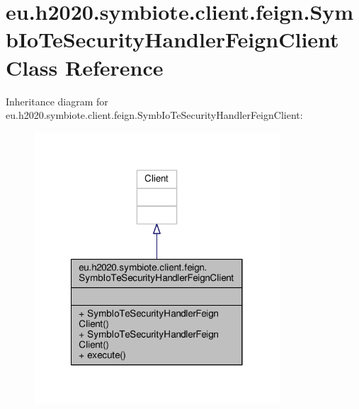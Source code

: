 \hypertarget{classeu_1_1h2020_1_1symbiote_1_1client_1_1feign_1_1SymbIoTeSecurityHandlerFeignClient}{}\section{eu.\+h2020.\+symbiote.\+client.\+feign.\+Symb\+Io\+Te\+Security\+Handler\+Feign\+Client Class Reference}
\label{classeu_1_1h2020_1_1symbiote_1_1client_1_1feign_1_1SymbIoTeSecurityHandlerFeignClient}


Inheritance diagram for eu.\+h2020.\+symbiote.\+client.\+feign.\+Symb\+Io\+Te\+Security\+Handler\+Feign\+Client\+:\nopagebreak
\begin{figure}[H]
\begin{center}
\leavevmode
\includegraphics[width=260pt]{classeu_1_1h2020_1_1symbiote_1_1client_1_1feign_1_1SymbIoTeSecurityHandlerFeignClient__inherit__graph}
\end{center}
\end{figure}


